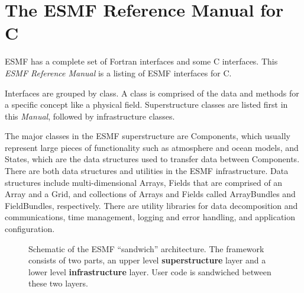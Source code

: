

\section{The ESMF Reference Manual for C}

ESMF has a complete set of Fortran interfaces and
some C interfaces.  This {\it ESMF Reference Manual} is a listing of 
ESMF interfaces for C.

Interfaces are grouped by class.  A class is comprised of the data and
methods for a specific concept like a physical field.  Superstructure classes 
are listed first in this {\it Manual}, followed by infrastructure 
classes.

The major classes in the ESMF superstructure are Components, which 
usually represent
large pieces of functionality such as atmosphere and ocean models,
and States, which are the data structures
used to transfer data between Components.  There are both data
structures and utilities in the ESMF 
infrastructure. Data structures include multi-dimensional Arrays, Fields
that are comprised of an Array and a Grid, and collections of Arrays
and Fields called ArrayBundles and FieldBundles, respectively.
There are utility libraries for data decomposition and communications,
time management, logging and error handling, and application configuration.

\begin{center}
\begin{figure}
\caption{Schematic of the ESMF ``sandwich'' architecture.
The framework consists of two parts, an upper level
{\bf superstructure} layer and a lower level {\bf infrastructure} layer.
User code is sandwiched between these two layers.}
\label{fig:TheESMFwich}
\end{figure}
\end{center}

